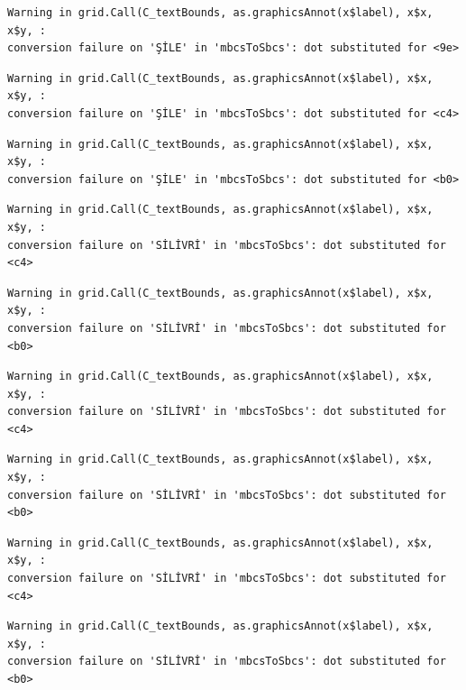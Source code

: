 \documentclass[
  11pt,
  a4paper,
  DIV=11,
  numbers=noendperiod]{scrartcl}
\begin{document}
\begin{verbatim}
Warning in grid.Call(C_textBounds, as.graphicsAnnot(x$label), x$x, x$y, :
conversion failure on 'ŞİLE' in 'mbcsToSbcs': dot substituted for <9e>
\end{verbatim}

\begin{verbatim}
Warning in grid.Call(C_textBounds, as.graphicsAnnot(x$label), x$x, x$y, :
conversion failure on 'ŞİLE' in 'mbcsToSbcs': dot substituted for <c4>
\end{verbatim}

\begin{verbatim}
Warning in grid.Call(C_textBounds, as.graphicsAnnot(x$label), x$x, x$y, :
conversion failure on 'ŞİLE' in 'mbcsToSbcs': dot substituted for <b0>
\end{verbatim}

\begin{verbatim}
Warning in grid.Call(C_textBounds, as.graphicsAnnot(x$label), x$x, x$y, :
conversion failure on 'SİLİVRİ' in 'mbcsToSbcs': dot substituted for <c4>
\end{verbatim}

\begin{verbatim}
Warning in grid.Call(C_textBounds, as.graphicsAnnot(x$label), x$x, x$y, :
conversion failure on 'SİLİVRİ' in 'mbcsToSbcs': dot substituted for <b0>
\end{verbatim}

\begin{verbatim}
Warning in grid.Call(C_textBounds, as.graphicsAnnot(x$label), x$x, x$y, :
conversion failure on 'SİLİVRİ' in 'mbcsToSbcs': dot substituted for <c4>
\end{verbatim}

\begin{verbatim}
Warning in grid.Call(C_textBounds, as.graphicsAnnot(x$label), x$x, x$y, :
conversion failure on 'SİLİVRİ' in 'mbcsToSbcs': dot substituted for <b0>
\end{verbatim}

\begin{verbatim}
Warning in grid.Call(C_textBounds, as.graphicsAnnot(x$label), x$x, x$y, :
conversion failure on 'SİLİVRİ' in 'mbcsToSbcs': dot substituted for <c4>
\end{verbatim}

\begin{verbatim}
Warning in grid.Call(C_textBounds, as.graphicsAnnot(x$label), x$x, x$y, :
conversion failure on 'SİLİVRİ' in 'mbcsToSbcs': dot substituted for <b0>
\end{verbatim}
\end{document}
